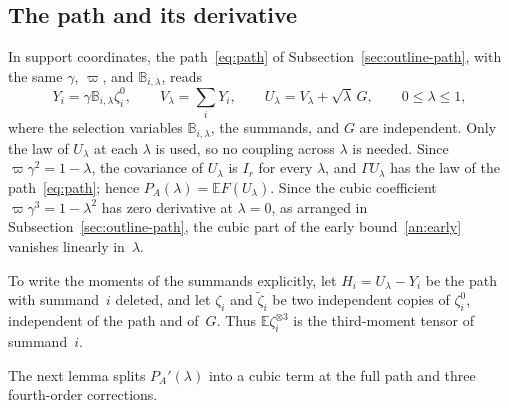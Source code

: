 \documentclass[11pt,letterpaper]{article}
\newif\ifshowrev
\newenvironment{revblock}{\ifshowrev\color{revblue}%
\hypersetup{linkcolor=revblue,citecolor=revblue,urlcolor=revblue}\fi}{}
\newif\ifshowtrim
\newcommand{\trim}[1]{\ifshowtrim{\color{revblue}%
\hypersetup{linkcolor=revblue,citecolor=revblue,urlcolor=revblue}#1}\else#1\fi}
\newcommand{\trs}[1]{\ifshowtrim{\color{revblue}#1}\else#1\fi}
\newif\ifshowskill
\newcommand{\sks}[1]{\ifshowskill{\color{revblue}#1}\else#1\fi}
\theoremstyle{remark}
\newcommand{\E}{\mathbb E}
\begin{document}
\begin{revblock}
\subsection{The path and its derivative}
\label{appx-an:sec:path}

\trim{In support coordinates, the path~\eqref{eq:path} of
Subsection~\ref{sec:outline-path}, with the same \(\gamma\), \(\sks{\varpi}\), and
\(\sks{\mathbb B}_{i,\lambda}\), reads}
\begin{equation}
 Y_i=\gamma \sks{\mathbb B}_{i,\lambda}\zeta_i^0,\qquad V_\lambda=\sum_iY_i,
 \qquad U_\lambda=V_\lambda+\sqrt\lambda\,G,
 \qquad \trs{0\le\lambda\le1},
 \label{appx-an:path}
\end{equation}
where the selection variables \(\sks{\mathbb B}_{i,\lambda}\), the summands, and \(G\) are
independent. Only the law of \(U_\lambda\) at each \(\lambda\) is used,
so no coupling across \(\lambda\) is needed. Since \(\sks{\varpi}\gamma^2=1-\lambda\),
the covariance of \(U_\lambda\) is \(I_r\) for every \(\lambda\), and
\(\Gamma U_\lambda\) has the law of the path~\eqref{eq:path}; hence
\(P_A(\lambda)=\E F(U_\lambda)\). \trim{Since} the cubic coefficient
\(\sks{\varpi}\gamma^3=1-\lambda^2\) has zero derivative at \(\lambda=0\)\trim{, as
arranged in Subsection~\ref{sec:outline-path},} the cubic part of the
early bound~\eqref{an:early} vanishes linearly in~\(\lambda\).

To write the moments of the summands explicitly, let \(H_i=U_\lambda-Y_i\) be the
path with summand~\(i\) deleted, and let \(\zeta_i\) and
\(\widetilde\zeta_i\) be two independent copies of \(\zeta_i^0\),
independent of the path and of~\(G\). Thus \(\E\zeta_i^{\otimes3}\) is
the third-moment tensor of summand~\(i\).

The next lemma splits \(P_A'(\lambda)\) into a cubic term at the full
path and three fourth-order corrections.


\end{revblock}
\end{document}
